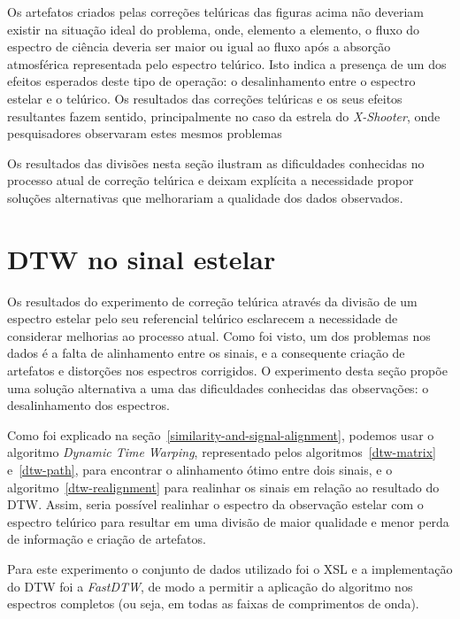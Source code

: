 Os artefatos criados pelas correções telúricas das figuras acima não deveriam existir na situação ideal do problema, onde, elemento a elemento, o fluxo do espectro de ciência deveria ser maior ou igual ao fluxo após a absorção atmosférica representada pelo espectro telúrico. Isto indica a presença de um dos efeitos esperados deste tipo de operação: o desalinhamento entre o espectro estelar e o telúrico. Os resultados das correções telúricas e os seus efeitos resultantes fazem sentido, principalmente no caso da estrela do \textit{X-Shooter}, onde pesquisadores observaram estes mesmos problemas \citep{unpublished-xshooter-data-release, wavelength-shifts}

Os resultados das divisões nesta seção ilustram as dificuldades conhecidas no processo atual de correção telúrica e deixam explícita a necessidade propor soluções alternativas que melhorariam a qualidade dos dados observados.

\section{DTW no sinal estelar}

Os resultados do experimento de correção telúrica através da divisão de um espectro estelar pelo seu referencial telúrico esclarecem a necessidade de considerar melhorias ao processo atual. Como foi visto, um dos problemas nos dados é a falta de alinhamento entre os sinais, e a consequente criação de artefatos e distorções nos espectros corrigidos. O experimento desta seção propõe uma solução alternativa a uma das dificuldades conhecidas das observações: o desalinhamento dos espectros.

Como foi explicado na seção~\ref{similarity-and-signal-alignment}, podemos usar o algoritmo \textit{Dynamic Time Warping}, representado pelos algoritmos~\ref{dtw-matrix} e~\ref{dtw-path}, para encontrar o alinhamento ótimo entre dois sinais, e o algoritmo~\ref{dtw-realignment} para realinhar os sinais em relação ao resultado do DTW. Assim, seria possível realinhar o espectro da observação estelar com o espectro telúrico para resultar em uma divisão de maior qualidade e menor perda de informação e criação de artefatos. 

Para este experimento o conjunto de dados utilizado foi o XSL e a implementação do DTW foi a \textit{FastDTW}, de modo a permitir a aplicação do algoritmo nos espectros completos (ou seja, em todas as faixas de comprimentos de onda).

